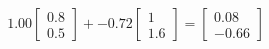 \documentclass[preview]{standalone}
\begin{document}
\begin{align*}
1.00 \begin{bmatrix} 0.8 \\ 0.5 \end{bmatrix} + -0.72 \begin{bmatrix} 1 \\ 1.6 \end{bmatrix} = \begin{bmatrix} 0.08 \\ -0.66 \end{bmatrix}
\end{align*}
\end{document}
